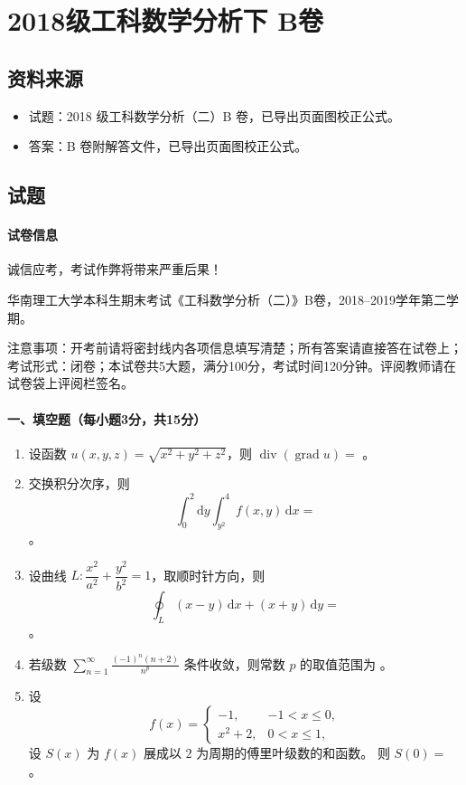 \section{2018级工科数学分析下 B卷}

\subsection{资料来源}
\begin{itemize}
  \item 试题：2018 级工科数学分析（二）B 卷，已导出页面图校正公式。
  \item 答案：B 卷附解答文件，已导出页面图校正公式。
\end{itemize}

\subsection{试题}

\paragraph*{试卷信息}
诚信应考，考试作弊将带来严重后果！

华南理工大学本科生期末考试《工科数学分析（二）》B卷，2018--2019学年第二学期。

注意事项：开考前请将密封线内各项信息填写清楚；所有答案请直接答在试卷上；考试形式：闭卷；本试卷共5大题，满分100分，考试时间120分钟。评阅教师请在试卷袋上评阅栏签名。

\paragraph*{一、填空题（每小题3分，共15分）}
\begin{enumerate}
  \item 设函数 \(u(x,y,z)=\sqrt{x^2+y^2+z^2}\)，则 \(\operatorname{div}(\operatorname{grad}u)=\) \underline{\hspace{5cm}}。
  \item 交换积分次序，则
  \[
    \int_0^2\mathrm{d}y\int_{y^2}^{4}f(x,y)\,\mathrm{d}x=
  \]
  \underline{\hspace{5cm}}。
  \item 设曲线 \(L:\dfrac{x^2}{a^2}+\dfrac{y^2}{b^2}=1\)，取顺时针方向，则
  \[
    \oint_L(x-y)\,\mathrm{d}x+(x+y)\,\mathrm{d}y=
  \]
  \underline{\hspace{5cm}}。
  \item 若级数 \(\displaystyle \sum_{n=1}^{\infty}\frac{(-1)^n(n+2)}{n^p}\) 条件收敛，则常数 \(p\) 的取值范围为 \underline{\hspace{5cm}}。
  \item 设
  \[
    f(x)=
    \begin{cases}
      -1, & -1<x\le0,\\
      x^2+2, & 0<x\le1,
    \end{cases}
  \]
  设 \(S(x)\) 为 \(f(x)\) 展成以 \(2\) 为周期的傅里叶级数的和函数。
  则 \(S(0)=\) \underline{\hspace{5cm}}。
\end{enumerate}

